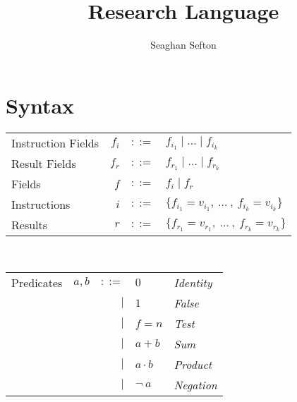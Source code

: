 \documentclass[12pt, letterpaper]{article}
\title{Research Language}
\author{Seaghan Sefton}
\begin{document}
\section{Syntax}

    \begin{tabular}{l r c l}
        Instruction Fields   & $f_{i}$   & $::=$     & $f_{i_{1}} \mid \dots \mid f_{i_{k}}$\\
        Result Fields   & $f_{r}$   & $::=$     & $f_{r_{1}} \mid \dots \mid f_{r_{k}}$\\
        Fields          & $f$       & $::=$     & $f_i \mid f_r$ \\
        Instructions         & $i$       & $::=$     & $\{f_{i_{1}} = v_{i_{1}} ,\ \dots\ ,\ f_{i_{k}} = v_{i_{k}}\}$\\
        Results         & $r$       & $::=$     & $\{f_{r_{1}} = v_{r_{1}} ,\ \dots\ ,\ f_{r_{k}} = v_{r_{k}}\}$\\
    \end{tabular}\\

    \begin{tabular}{l c r l l}
        Predicates  & $a,b$     & $::=$  & $0$          & \textit{Identity} \\
                    &           & $\mid$ & $1$          & \textit{False}    \\
                    &           & $\mid$ & $f=n$        & \textit{Test} \\  
                    &           & $\mid$ & $a + b$      & \textit{Sum}      \\
                    &           & $\mid$ & $a \cdot b$  & \textit{Product}  \\
                    &           & $\mid$ & $\neg \ a$   & \textit{Negation}
    \end{tabular}\\
\end{document}
